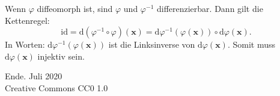 \documentclass{beamer}
\newcommand{\modest}[1]{{\small\color{gray}#1}}
\begin{document}
\begin{frame}
Wenn $\varphi$ diffeomorph ist, sind $\varphi$ und $\varphi^{-1}$
differenzierbar. Dann gilt die Kettenregel:
\[\mathrm{id} = \mathrm d(\varphi^{-1}\circ\varphi)(\mathbf x)
= \mathrm d\varphi^{-1}(\varphi(\mathbf x))\circ\mathrm d\varphi(\mathbf x).\]
In Worten: $\mathrm d\varphi^{-1}(\varphi(\mathbf x))$ ist die
Linksinverse von $\mathrm d\varphi(\mathbf x)$. Somit muss
$\mathrm d\varphi(\mathbf x)$ injektiv sein.
\end{frame}

\begin{frame}
Ende.
\vfill\hfill\modest{Juli 2020}\\
\hfill\modest{Creative Commons CC0 1.0}
\end{frame}
\end{document}
